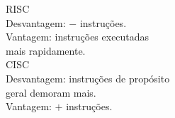\documentclass[preview]{standalone}
\begin{document}
RISC\\ Desvantagem: $-$ instruções. \\Vantagem: instruções executadas \\ mais rapidamente.\\CISC\\ Desvantagem: instruções de propósito\\ geral demoram mais. \\Vantagem: $+$ instruções.\\
\end{document}
